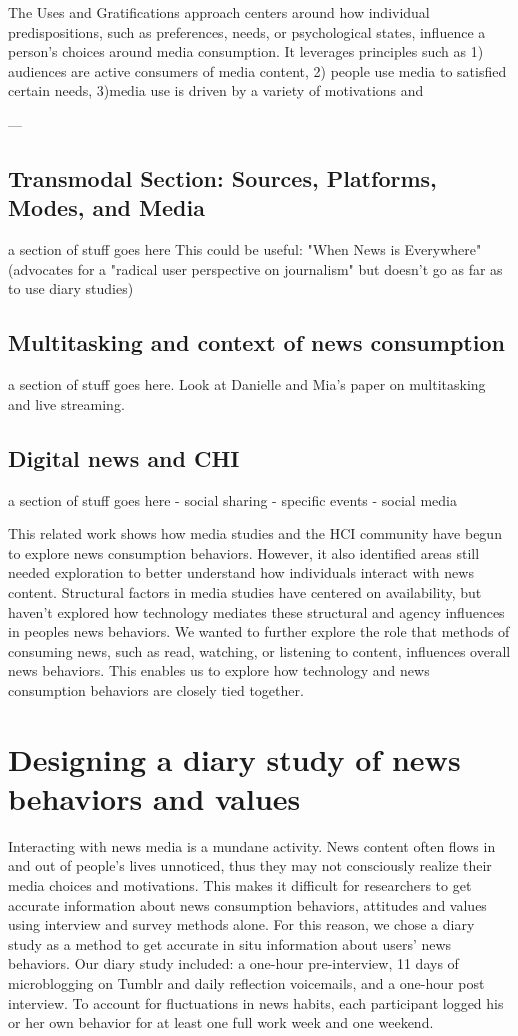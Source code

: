 \documentclass[sigchi]{acmart}
\begin{document}
The Uses and Gratifications approach centers around how individual predispositions, such as preferences, needs, or psychological states, influence a person's choices around media consumption. It leverages principles such as 1) audiences are active consumers of media content, 2) people use media to satisfied certain needs, 3)media use is driven by a variety of motivations and 

---
\subsection{Transmodal Section: Sources, Platforms, Modes, and Media}
a section of stuff goes here
This could be useful: "When News is Everywhere" (advocates for a "radical user perspective on journalism" but doesn't go as far as to use diary studies)
\subsection{Multitasking and context of news consumption}
a section of stuff goes here. Look at Danielle and Mia's paper on multitasking and live streaming. 
\subsection{Digital news and CHI}
a section of stuff goes here 
 - social sharing 
 - specific events
 - social media 

This related work shows how media studies and the HCI community have begun to explore news consumption behaviors. However, it also identified areas still needed exploration to better understand how individuals interact with news content. Structural factors in media studies have centered on availability, but haven't explored how technology mediates these structural and agency influences in peoples news behaviors.  We wanted to further explore the role that methods of consuming news, such as read, watching, or listening to content, influences overall news behaviors. This enables us to explore how technology and news consumption behaviors are closely tied together. 

\section{Designing a diary study of news behaviors and values}
Interacting with news media is a mundane activity. News content often flows in and out of people's lives unnoticed, thus they may not consciously realize their media choices and motivations. This makes it difficult for researchers to get accurate information about news consumption behaviors, attitudes and values using interview and survey methods alone. For this reason, we chose a diary study as a method to get accurate in situ information about users’ news behaviors. Our diary study included: a one-hour pre-interview, 11 days of microblogging on Tumblr and daily reflection voicemails, and a one-hour post interview. To account for fluctuations in news habits, each participant logged his or her own behavior for at least one full work week and one weekend.
\end{document}
